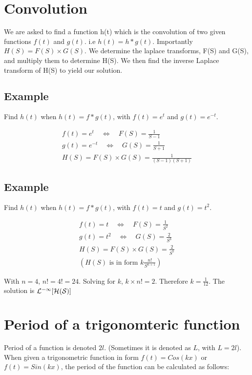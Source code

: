\documentclass[12pt, a4paper]{article}
\begin{document}
\section{Convolution}
We are asked to find a function h(t) which is the convolution of
two given functions $f(t)$ and $g(t)$. i.e $h(t)=h*g(t)$.\newline
Importantly $H(S) = F(S)\times G(S)$. We determine the laplace
transforms, F(S) and G(S), and multiply them to determine H(S). We
then find the inverse Laplace transform of H(S) to yield our
solution.
\subsection{Example}
Find $h(t)$ when $h(t) = f*g(t)$, with $f(t)= e^{t}$ and $g(t)=
e^{-t}$.\newline

\begin{eqnarray}
f(t) = e^{t} \quad \Leftrightarrow \quad F(S)= \frac{1}{S-1}
 \nonumber\\
g(t) = e^{-t} \quad \Leftrightarrow \quad G(S)= \frac{1}{S+1}
 \nonumber\\
H(S) = F(S)\times G(S) = \frac{1}{(S-1)(S+1)}
 \nonumber
\end{eqnarray}
\subsection{Example}
Find $h(t)$ when $h(t) = f*g(t)$, with $f(t)= t$ and $g(t)=
t^2$.\newline

\begin{eqnarray}
f(t) = t \quad \Leftrightarrow \quad F(S)= \frac{1}{S^2}
 \nonumber\\
g(t) = t^2 \quad \Leftrightarrow \quad G(S)= \frac{2}{S^3}
 \nonumber\\
H(S) = F(S)\times G(S) = \frac{2}{S^5}
 \nonumber\\
(H(S) \mbox{ is in form }  k\frac{n!}{S^{n+1}} )
 \nonumber
\end{eqnarray}

With $n=4$, $n!= 4! = 24$. Solving for $k$, $k \times n! = 2$.
Therefore $k=\frac{1}{12}$. The solution is $\cal{L}^{-1}[H(S)]$

\section{Period of a trigonomteric function}
Period of a function is denoted $2l$. (Sometimes it is denoted as
$L$, with $L=2l$). \newline When given a trigonometric function in
form $f(t) = Cos(kx)$ or $f(t)= Sin(kx)$, the period of the
function can be calculated as follows:
\end{document}

